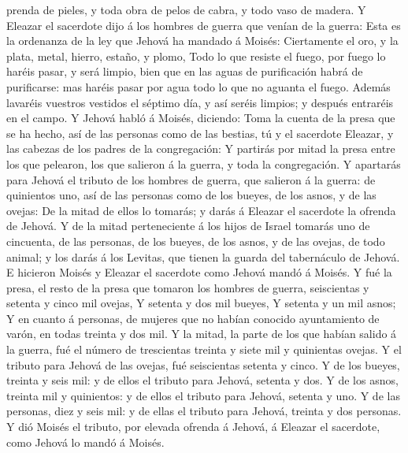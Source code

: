 prenda de pieles, y toda obra de pelos de cabra, y todo vaso de madera.
 Y Eleazar el sacerdote dijo á los hombres de guerra que
venían de la guerra: Esta es la ordenanza de la ley que Jehová ha
mandado á Moisés:  Ciertamente el oro, y la plata, metal,
hierro, estaño, y plomo,  Todo lo que resiste el fuego,
por fuego lo haréis pasar, y será limpio, bien que en las aguas de
purificación habrá de purificarse: mas haréis pasar por agua todo lo que
no aguanta el fuego.  Además lavaréis vuestros vestidos
el séptimo día, y así seréis limpios; y después entraréis en el campo.
 Y Jehová habló á Moisés, diciendo:  Toma
la cuenta de la presa que se ha hecho, así de las personas como de las
bestias, tú y el sacerdote Eleazar, y las cabezas de los padres de la
congregación:  Y partirás por mitad la presa entre los
que pelearon, los que salieron á la guerra, y toda la congregación.
 Y apartarás para Jehová el tributo de los hombres de
guerra, que salieron á la guerra: de quinientos uno, así de las personas
como de los bueyes, de los asnos, y de las ovejas:  De la
mitad de ellos lo tomarás; y darás á Eleazar el sacerdote la ofrenda de
Jehová.  Y de la mitad perteneciente á los hijos de
Israel tomarás uno de cincuenta, de las personas, de los bueyes, de los
asnos, y de las ovejas, de todo animal; y los darás á los Levitas, que
tienen la guarda del tabernáculo de Jehová.  E hicieron
Moisés y Eleazar el sacerdote como Jehová mandó á Moisés.
 Y fué la presa, el resto de la presa que tomaron los
hombres de guerra, seiscientas y setenta y cinco mil ovejas,
 Y setenta y dos mil bueyes,  Y setenta y
un mil asnos;  Y en cuanto á personas, de mujeres que no
habían conocido ayuntamiento de varón, en todas treinta y dos mil.
 Y la mitad, la parte de los que habían salido á la
guerra, fué el número de trescientas treinta y siete mil y quinientas
ovejas.  Y el tributo para Jehová de las ovejas, fué
seiscientas setenta y cinco.  Y de los bueyes, treinta y
seis mil: y de ellos el tributo para Jehová, setenta y dos.
 Y de los asnos, treinta mil y quinientos: y de ellos el
tributo para Jehová, setenta y uno.  Y de las personas,
diez y seis mil: y de ellas el tributo para Jehová, treinta y dos
personas.  Y dió Moisés el tributo, por elevada ofrenda á
Jehová, á Eleazar el sacerdote, como Jehová lo mandó á Moisés.
